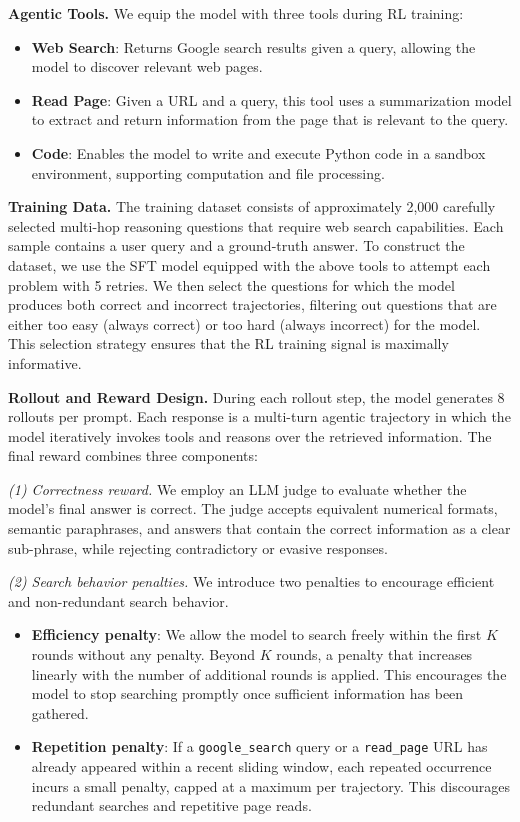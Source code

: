 \textbf{Agentic Tools.} We equip the model with three tools during RL training:
\begin{itemize}
    \item \textbf{Web Search}: Returns Google search results given a query, allowing the model to discover relevant web pages.
    \item \textbf{Read Page}: Given a URL and a query, this tool uses a summarization model to extract and return information from the page that is relevant to the query.
    \item \textbf{Code}: Enables the model to write and execute Python code in a sandbox environment, supporting computation and file processing.
\end{itemize}

\textbf{Training Data.} The training dataset consists of approximately 2,000 carefully selected multi-hop reasoning questions that require web search capabilities. Each sample contains a user query and a ground-truth answer. To construct the dataset, we use the SFT model equipped with the above tools to attempt each problem with 5 retries. We then select the questions for which the model produces both correct and incorrect trajectories, filtering out questions that are either too easy (always correct) or too hard (always incorrect) for the model. This selection strategy ensures that the RL training signal is maximally informative.

\textbf{Rollout and Reward Design.}
During each rollout step, the model generates 8 rollouts per prompt. Each response is a multi-turn agentic trajectory in which the model iteratively invokes tools and reasons over the retrieved information. The final reward combines three components:

\textit{(1) Correctness reward.} We employ an LLM judge to evaluate whether the model's final answer is correct. The judge accepts equivalent numerical formats, semantic paraphrases, and answers that contain the correct information as a clear sub-phrase, while rejecting contradictory or evasive responses.

\textit{(2) Search behavior penalties.} We introduce two penalties to encourage efficient and non-redundant search behavior.
\begin{itemize}
    \item \textbf{Efficiency penalty}: We allow the model to search freely within the first $K$ rounds without any penalty. Beyond $K$ rounds, a penalty that increases linearly with the number of additional rounds is applied. This encourages the model to stop searching promptly once sufficient information has been gathered.
    \item \textbf{Repetition penalty}: If a \texttt{google\_search} query or a \texttt{read\_page} URL has already appeared within a recent sliding window, each repeated occurrence incurs a small penalty, capped at a maximum per trajectory. This discourages redundant searches and repetitive page reads.
\end{itemize}

